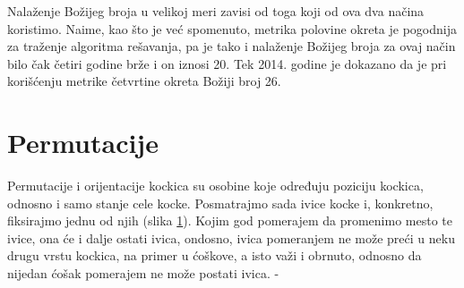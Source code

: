 \documentclass[a4paper]{article}
\begin{document}
Nalaženje Božijeg broja u velikoj meri zavisi od toga koji od ova dva načina koristimo. Naime, kao što je već spomenuto, metrika polovine okreta je pogodnija za traženje algoritma rešavanja, pa je tako i nalaženje Božijeg broja za ovaj način bilo čak četiri godine brže i on iznosi 20. Tek 2014. godine je dokazano da je pri korišćenju metrike četvrtine okreta Božiji broj 26.

\section{Permutacije}
\label{permutacije}

Permutacije i orijentacije kockica su osobine koje određuju poziciju kockica, odnosno i samo stanje cele kocke.
Posmatrajmo sada ivice kocke i, konkretno, fiksirajmo jednu od njih (slika \ref{fig:ivica-pomeranje}). Kojim god pomerajem da promenimo mesto te ivice, ona će i dalje ostati ivica, ondosno, ivica pomeranjem ne može preći u neku drugu vrstu kockica, na primer u ćoškove, a isto važi i obrnuto, odnosno da nijedan ćošak pomerajem ne može postati ivica.
-
\begin{figure}[h]
        \centering
        \caption{}
        \label{fig:ivica-pomeranje}
    \end{figure}
\end{document}
